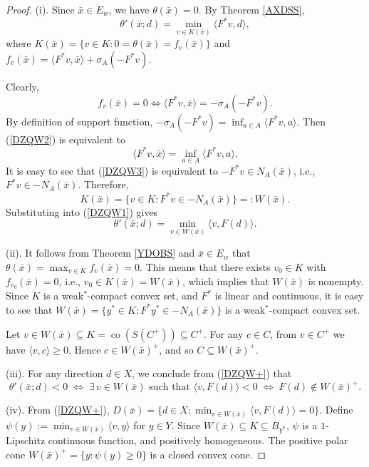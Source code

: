 \documentclass[11pt]{article}
\begin{document}
\begin{proof}
(i).	Since $\bar{x} \in E_w$, we have $\theta(\bar{x}) = 0$.
	By Theorem \ref{AXDSS},
	\begin{equation}\label{DZQW1}
		\theta'(\bar{x} ;d)=\min_{v\in K(\bar{x})}\langle F^*v,d\rangle ,
	\end{equation}
	where $K(\bar{x}) = \{ v \in K : 0 = \theta(\bar{x}) = f_v(\bar{x}) \}$ and $f_v(\bar{x})= \langle F^*v,\bar{x} \rangle+\sigma_A(-F^*v)$.
	
	Clearly,
	\begin{equation}\label{DZQW2}
	f_v( \bar{x} ) = 0 \iff \langle F^* v, \bar{x} \rangle = -\sigma_A(-F^*v).
	\end{equation}
	By definition of support function, $-\sigma_A(-F^* v) = \inf_{a \in A} \langle F^* v, a \rangle$. Then (\ref{DZQW2}) is equivalent to
	\begin{equation}\label{DZQW3}
	\langle F^* v, \bar{x} \rangle = \inf_{a \in A} \langle F^* v, a \rangle.
	\end{equation}
	  It is easy to see that (\ref{DZQW3}) is equivalent to $-F^* v \in N_A(\bar{x})$, i.e., $F^* v \in -N_A(\bar{x})$. Therefore,
	\[
	K(\bar{x}) = \{ v \in K : F^* v \in -N_A(\bar{x}) \} =: W(\bar{x}).
	\]
	Substituting into (\ref{DZQW1}) gives
	\[
	\theta'(\bar{x}; d) = \min_{v \in W(\bar{x})} \langle v, F(d) \rangle.
	\]
	
	
	(ii).    It follows from    Theorem  \ref{YDOBS} and $\bar{x} \in E_w$  that $\theta(\bar{x}) = \max_{v \in K} f_v(\bar{x}) = 0$.  This means that  there exists $v_0 \in K$ with $f_{v_0}(\bar{x}) = 0$, i.e., $v_0 \in K(\bar{x}) = W(\bar{x})$,  which implies that $W(\bar{x})$ is nonempty.
	Since $K$ is a weak$^*$-compact convex set, and $F^*$ is   linear and continuous, it is easy to see that 
	$W(\bar{x}) = \bigl\{ y^* \in K : F^* y^* \in -N_A(\bar{x}) \bigr\}$ is a weak$^*$-compact convex set.
	
	
  Let $v \in W(\bar{x}) \subseteq K = \operatorname{co}(S(C^+)) \subseteq C^+$. For any $c \in C$, from $v \in C^+$ we have $\langle v, c \rangle \ge 0$. Hence $c \in W(\bar{x})^+$, and so $C \subseteq W(\bar{x})^+$.  
	
 
		(iii).  For any direction $d \in X$, we conclude from    (\ref{DZQW+})  that
	\[
	\theta'(\bar{x}; d) < 0
	\;\Longleftrightarrow\;
	\exists\, v \in W(\bar{x}) \text{ such that } \langle v, F(d) \rangle < 0
	\;\Longleftrightarrow\;
	F(d) \notin W(\bar{x})^+.
	\]
 
(iv).		From (\ref{DZQW+}), $D(\bar{x})=\{d\in X : \min_{v\in W(\bar{x})}\langle v,F(d)\rangle =0\}$. Define $\psi(y):=\min_{v\in W(\bar{x})}\langle v,y\rangle$ for $y\in Y$.
		Since $W(\bar{x})\subseteq K\subseteq B_{Y^{*}}$, $\psi$ is a $1$-Lipschitz continuous function, and positively homogeneous. The positive polar cone $W(\bar{x})^{+}=\{y:\psi(y)\ge0\}$ is a closed convex cone.
	

\end{proof}
\end{document}
